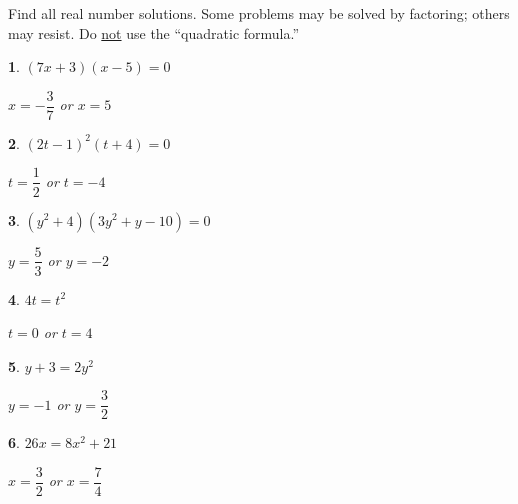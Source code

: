\documentclass{amsbook}
\newtheorem{exc}{}
\newenvironment{ex}{\begin{exc}\normalfont}{\end{exc}}
\numberwithin{section}{chapter}
\numberwithin{equation}{chapter}
\begin{document}
Find all real number solutions. Some problems may be solved by factoring; others may resist. Do \underline{not} use the ``quadratic formula.''
\begin{multicols}{2}

\begin{ex}
	$(7x+3)(x-5) = 0$
	\begin{sol}
		$x = -\dfrac{3}{7}$ or $x = 5$ 
	\end{sol}
\end{ex}
\begin{ex}
	$(2t-1)^2 (t+4) = 0$
	\begin{sol}
		$t = \dfrac{1}{2}$ or $t = -4$
	\end{sol}
\end{ex}
\begin{ex}
	$(y^2 + 4)(3y^2 +y - 10) = 0$
	\begin{sol}
		$y = \dfrac{5}{3}$ or $y = -2$
	\end{sol}
\end{ex}
\begin{ex}
	$4t = t^2$
	\begin{sol}
		$t = 0$ or $t = 4$\
	\end{sol}
\end{ex}
\begin{ex}
	 $y+3 = 2y^2$
	\begin{sol}
		$y = -1$ or $y = \dfrac{3}{2}$
	\end{sol}
\end{ex}
\begin{ex}
	$26x = 8x^2 + 21$
	\begin{sol}
		 $x = \dfrac{3}{2}$ or $x = \dfrac{7}{4}$ 
	\end{sol}
\end{ex}


\end{multicols}
\end{document}
